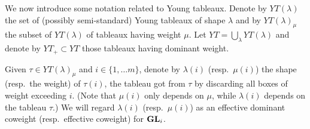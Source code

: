 \documentclass[draft]{article} %
\begin{document}

We now introduce some notation related to Young tableaux. Denote by $YT(\lambda)$ the set of (possibly semi-standard) Young tableaux of shape $\lambda$ and by $YT(\lambda)_\mu$ the subset of $YT(\lambda)$ of tableaux having weight $\mu$. Let $YT = \bigcup_\lambda YT(\lambda)$ and denote by $YT_+\subset YT$ those tableaux having dominant weight. 

Given $\tau\in YT(\lambda)_\mu$ and $ i \in \{1, \dots m\} $, denote by $\lambda(i)$ (resp.\ $\mu(i)$) the shape (resp.\ the weight) of $\tau(i)$, the tableau got from $\tau$ by discarding all boxes of weight exceeding $i$. (Note that $ \mu(i)$ only depends on $ \mu$, while $ \lambda(i)$ depends on the tableau $ \tau$.)  We will regard $ \lambda(i)$ (resp.\ $\mu(i)$) as an effective dominant coweight (resp.\ effective coweight) for ${\mathbf{GL}}_i$. 
% 
\end{document}
